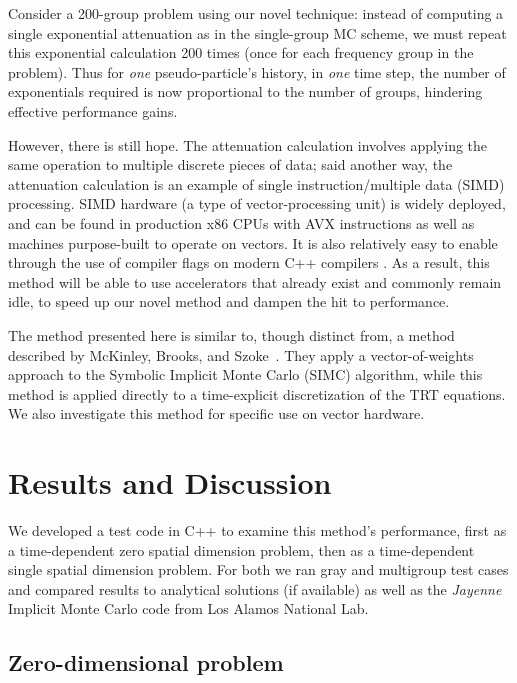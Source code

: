Consider a 200-group problem using our novel technique: instead of computing a single exponential attenuation as in the single-group MC scheme, we must repeat this exponential calculation 200 times (once for each frequency group in the problem).
Thus for \textit{one} pseudo-particle's history, in \textit{one} time step, the number of exponentials required is now proportional to the number of groups, hindering effective performance gains.

However, there is still hope.
The attenuation calculation involves applying the same operation to multiple discrete pieces of data; said another way, the attenuation calculation is an example of single instruction/multiple data (SIMD) processing.
SIMD hardware (a type of vector-processing unit) is widely deployed, and can be found in production x86 CPUs with AVX instructions as well as machines purpose-built to operate on vectors. 
It is also relatively easy to enable through the use of compiler flags on modern C++ compilers \cite{OpenMP2018}. 
As a result, this method will be able to use accelerators that already exist and commonly remain idle, to speed up our novel method and dampen the hit to performance.

The method presented here is similar to, though distinct from, a method described by McKinley, Brooks, and Szoke~\cite{McKinley2003}.
They apply a vector-of-weights approach to the Symbolic Implicit Monte Carlo (SIMC) algorithm, while this method is applied directly to a time-explicit discretization of the TRT equations.
We also investigate this method for specific use on vector hardware.

\section{Results and Discussion}
We developed a test code in C++ to examine this method's performance, first as a time-dependent zero spatial dimension problem, then as a time-dependent single spatial dimension problem. 
For both we ran gray and multigroup test cases and compared results to analytical solutions (if available) as well as the \textit{Jayenne} Implicit Monte Carlo code from Los Alamos National Lab.

\subsection{Zero-dimensional problem}

